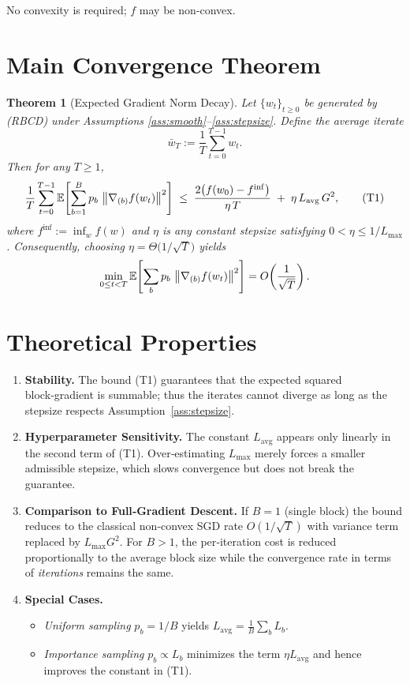 \documentclass{article}
\newtheorem{theorem}{Theorem}
\newcommand{\E}{\mathbb{E}}
\newcommand{\norm}[1]{\left\|#1\right\|}
\newcommand{\grad}[1]{\nabla #1}
\begin{document}
No convexity is required; $f$ may be non‑convex.

\section*{Main Convergence Theorem}
\begin{theorem}[Expected Gradient Norm Decay]\label{thm:main}
Let $\{w_{t}\}_{t\ge0}$ be generated by (RBCD) under Assumptions
\ref{ass:smooth}–\ref{ass:stepsize}.
Define the average iterate
\[
\bar w_{T}:=\frac{1}{T}\sum_{t=0}^{T-1} w_{t}.
\]
Then for any $T\ge1$,
\[
\frac{1}{T}\sum_{t=0}^{T-1}\E\!\left[
\sum_{b=1}^{B}p_{b}\,\norm{\grad_{(b)}f(w_{t})}^{2}\right]
\;\le\;
\frac{2\bigl(f(w_{0})-f^{\inf}\bigr)}{\eta\,T}
\;+\;
\eta\,L_{\mathrm{avg}}\,G^{2},
\tag{T1}
\]
where $f^{\inf}:=\inf_{w}f(w)$ and $\eta$ is any constant stepsize satisfying
$0<\eta\le 1/L_{\max}$.
Consequently, choosing $\eta = \Theta\!\bigl(1/\sqrt{T}\bigr)$ yields
\[
\min_{0\le t<T}\E\!\left[
\sum_{b}p_{b}\,\norm{\grad_{(b)}f(w_{t})}^{2}\right]
= O\!\left(\frac{1}{\sqrt{T}}\right).
\]
\end{theorem}

\section*{Theoretical Properties}
\begin{enumerate}[label={\arabic*.}]
\item \textbf{Stability.}
The bound (T1) guarantees that the expected squared block‑gradient is
summable; thus the iterates cannot diverge as long as the stepsize respects
Assumption~\ref{ass:stepsize}.

\item \textbf{Hyperparameter Sensitivity.}
The constant $L_{\mathrm{avg}}$ appears only linearly in the second term of
(T1).  Over‑estimating $L_{\max}$ merely forces a smaller admissible stepsize,
which slows convergence but does not break the guarantee.

\item \textbf{Comparison to Full‑Gradient Descent.}
If $B=1$ (single block) the bound reduces to the classical non‑convex SGD
rate $O(1/\sqrt{T})$ with variance term replaced by $L_{\max}G^{2}$.  For
$B>1$, the per‑iteration cost is reduced proportionally to the average block
size while the convergence rate in terms of \emph{iterations} remains the same.

\item \textbf{Special Cases.}
\begin{itemize}
\item \emph{Uniform sampling} $p_{b}=1/B$ yields $L_{\mathrm{avg}}=\frac{1}{B}\sum_{b}L_{b}$.
\item \emph{Importance sampling} $p_{b}\propto L_{b}$ minimizes the term
$\eta L_{\mathrm{avg}}$ and hence improves the constant in (T1).
\end{itemize}
\end{enumerate}
\end{document}
